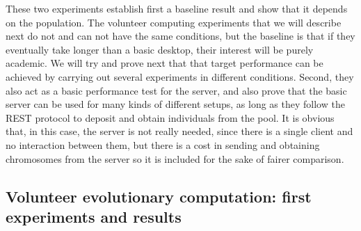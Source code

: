 \documentclass[journal,onecolumn]{IEEEtran}
\begin{document}
These two experiments establish first a baseline result and show that
it depends on the population. The volunteer computing experiments that we
will describe next do not and can not have the same conditions, but
the baseline is that if they eventually take longer than a basic
desktop, their interest will be purely academic. We will try and
prove next that that target performance can be achieved by carrying
out several experiments in different conditions. Second, they also act
as a basic performance test for the server, and also prove that the
basic server can be used for many kinds of different setups, as long
as they follow the REST protocol to deposit and obtain individuals
from the pool. It is obvious that, in this case, the server is not
really needed, since there is a single client and no interaction
between them, but there is a cost in sending and obtaining chromosomes
from the server so it is included for the sake of fairer comparison.

\subsection{Volunteer evolutionary computation: first experiments and results}
\end{document}
